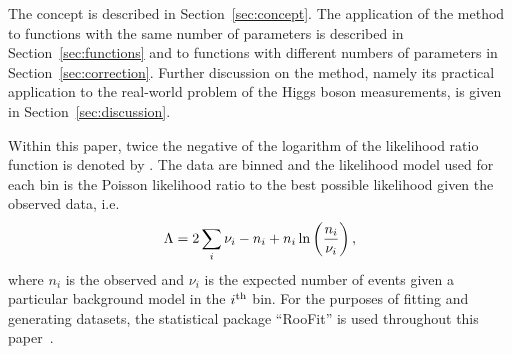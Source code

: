 The concept is described in Section~\ref{sec:concept}.
The application of the method to functions with the same number of parameters
is described in Section~\ref{sec:functions} and to functions with different
numbers of parameters in Section~\ref{sec:correction}. Further discussion on
the method, namely its practical application to the real-world problem of
the Higgs boson measurements, is given in Section~\ref{sec:discussion}.

Within this paper, twice the negative of the logarithm of the likelihood ratio 
function is denoted by \nll. The data are binned and the
likelihood model used for each bin is the Poisson likelihood ratio to the best
possible likelihood given the observed data, i.e.
\begin{equation}
\nll = 2%
\sum_{i} \nu_i - n_i + n_i \ln\left(\frac{n_i}{\nu_i}\right),
\label{eqn:introduction:def2NLL}
\end{equation}
where $n_{i}$ is the observed and $\nu_{i}$ is the expected number of events
given a particular background model in the $i^{\rm th}$ bin.
For the purposes of fitting and generating datasets, the statistical package
``RooFit'' is used throughout this paper~\cite{ref:roofit}.

